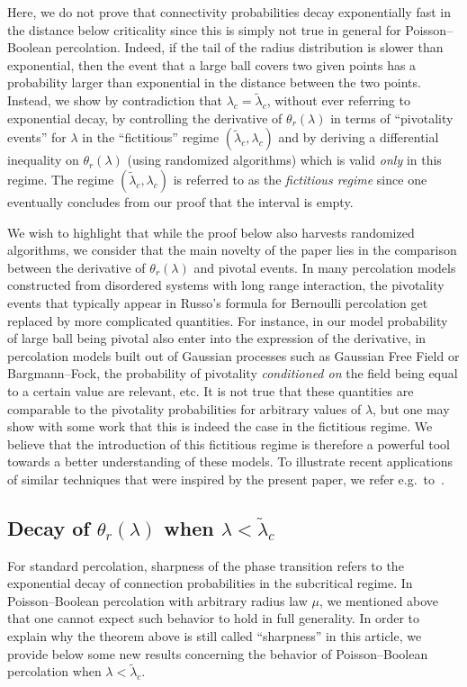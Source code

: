 \documentclass[10pt]{amsart}
\theoremstyle{definition}\newtheorem{defi}[theo]{Definition}\newtheorem{rema}[theo]{Remark}\newtheorem{exam}[theo]{Example}\newtheorem{exem}[theo]{Example}\newtheorem{nota}[theo]{Notation}
\begin{document}
Here, we do not prove that connectivity probabilities decay exponentially fast in the distance below criticality since this is simply not true in general for Poisson--Boolean percolation. Indeed, if the tail of the radius distribution is slower than exponential, then the event that a large ball covers two given points has a probability larger than exponential in the distance between the two points. Instead, we show by contradiction that $\lambda_c=\widetilde\lambda_c$, without ever referring to exponential decay, by controlling the derivative of $\theta_r(\lambda)$ in terms of ``pivotality events'' for $ \lambda$ in the ``fictitious'' regime $(\widetilde \lambda_c,\lambda_c)$ and by deriving a differential inequality on $\theta_r(\lambda)$ (using randomized algorithms) which is valid \emph{only} in this regime. The regime $(\widetilde \lambda_c,\lambda_c)$ is referred to as the \emph{fictitious regime} since one eventually concludes from our proof that the interval is empty.

We wish to highlight that while the proof below also harvests randomized \linebreak algorithms, we consider that the main novelty of the paper lies in the comparison between the derivative of $\theta_r(\lambda)$ and pivotal events. In many percolation models constructed from disordered systems with long range interaction, the pivotality events that typically appear in Russo's formula for Bernoulli percolation get replaced by more complicated quantities. For instance, in our model probability of large ball being pivotal also enter into the expression of the derivative, in percolation models built out of Gaussian processes such as Gaussian Free Field or Bargmann--Fock, the probability of pivotality \emph{conditioned on} the field being equal to a certain value are relevant, etc. It is not true that these quantities are comparable to the pivotality probabilities for arbitrary values of $\lambda$, but one may show with some work that this is indeed the case in the fictitious regime. We believe that the introduction of this fictitious regime is therefore a powerful tool towards a better understanding of these models. To illustrate recent applications of similar techniques that were inspired by the present paper, we refer e.g.~to~\cite{DGRS19,GRSY18}.


\subsection{Decay of $\theta_r(\lambda)$ when $\lambda<\widetilde\lambda_c$}
For standard percolation, sharpness of the phase transition refers to the exponential decay of connection probabilities in the subcritical regime. In Poisson--Boolean percolation with arbitrary radius law $\mu$, we mentioned above that one cannot expect such behavior to hold in full generality. In order to explain why the theorem above is still called ``sharpness'' in this article, we provide below some new results concerning the behavior of Poisson--Boolean percolation when $\lambda<\widetilde\lambda_c$.
\end{document}

